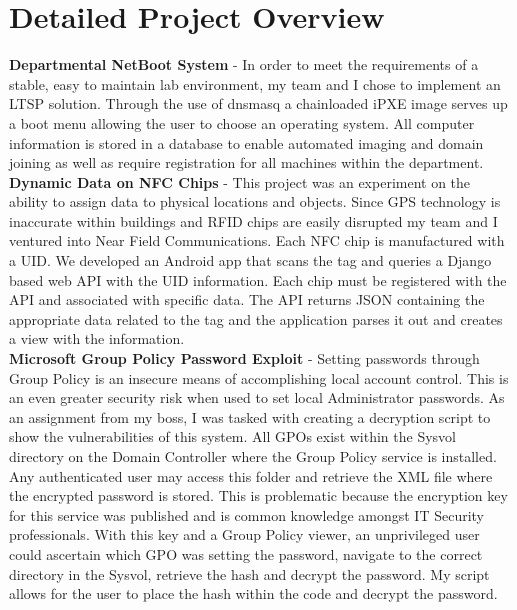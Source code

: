 \documentclass[10pt]{article} %
\begin{document}
\newpage 
\section{Detailed Project Overview}
\textbf{Departmental NetBoot System} - In order to meet the requirements of a stable, easy to maintain lab environment, my team
 and I chose to implement an LTSP solution. Through the use of dnsmasq a chainloaded iPXE image serves up a boot menu allowing the
 user to choose an operating system. All computer information is stored in a database to enable automated imaging and domain joining
 as well as require registration for all machines within the department. \\

\textbf{Dynamic Data on NFC Chips} - This project was an experiment on the ability to assign data to physical locations and objects. 
 Since GPS technology is inaccurate within buildings and RFID chips are easily disrupted my team and I ventured into Near Field Communications.
 Each NFC chip is manufactured with a UID. We developed an Android app that scans the tag and
 queries a Django based web API with the UID information. Each chip must be registered with the API and associated with specific data.
 The API returns JSON containing the appropriate data related to the tag and the application parses it out and creates a view with the
 information.\\

\textbf{Microsoft Group Policy Password Exploit} - Setting passwords through Group Policy is an insecure means of accomplishing local account
control. This is an even greater security risk when used to set local Administrator passwords. As an assignment from my boss, I was tasked with
creating a decryption script to show the vulnerabilities of this system. All GPOs exist within the Sysvol directory on the Domain Controller
 where the Group Policy service is installed. Any authenticated user may access this folder and retrieve the XML file where the encrypted password
 is stored. This is problematic because the encryption key for this service was published and is common knowledge amongst IT Security professionals.
 With this key and a Group Policy viewer, an unprivileged user could ascertain which GPO was setting the password, navigate to the correct
 directory in the Sysvol, retrieve the hash and decrypt the password. My script allows for the user to place the hash within the code and decrypt
 the password.\\
\end{document}
